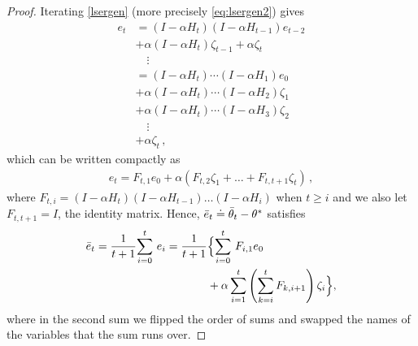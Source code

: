 \begin{proof}
Iterating \eqref{lsergen} (more precisely \eqref{eq:lsergen2}) gives
\begin{align*}
e_t
& = (I-\alpha H_t) (I-\alpha H_{t-1}) e_{t-2}\\ &+ \alpha (I-\alpha H_t) \zeta_{t-1} +\alpha \zeta_t \\
& \quad \vdots\\
& = (I-\alpha H_t) \cdots (I-\alpha H_1) e_0\\ &+ \alpha (I-\alpha H_t) \cdots (I-\alpha H_2) \zeta_1 \\
& + \alpha (I-\alpha H_t) \cdots (I-\alpha H_3) \zeta_2\\
&  \quad \vdots \\
&+ \alpha \zeta_t\,,
\end{align*}
which can be written compactly as
\begin{align}
\label{eq:etft}
e_t = F_{t,1} e_0 + \alpha (F_{t,2} \zeta_1 + \dots + F_{t,t+1} \zeta_t )\,,
\end{align}
where $F_{t,i} = (I-\alpha H_t) (I-\alpha H_{t-1}) \dots (I-\alpha H_i)$ when $t\ge i$ and we also let $F_{t,t+1}=I$, the identity matrix.
Hence, $\eb_t \doteq \tb_t-\ts$ satisfies
\begin{align*}
\eb_t=\frac{1}{t+1}\ous{\sum}{i=0}{t}e_i
=\frac{1}{t+1}&\Big\{\ous{\sum}{i=0}{t} F_{i,1} e_0 \\
&+ \alpha \sum_{i=1}^{t} \left(\sum_{k=i}^{t} F_{k,i+1} \right)\zeta_i \Big\} ,
\end{align*}
where in the second sum we flipped the order of sums and swapped the names of the variables that the sum runs over.


\end{proof}
